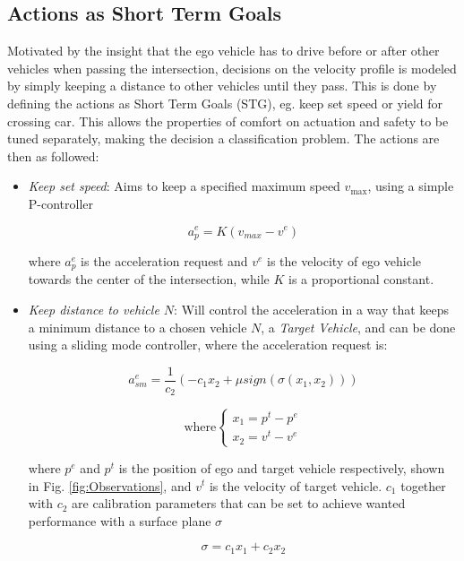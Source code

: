 \subsection{Actions as Short Term Goals}
\label{sec:actions}
Motivated by the insight that the ego vehicle has to drive before or after other vehicles when passing the intersection, decisions on the velocity profile is modeled by simply keeping a distance to other vehicles until they pass. This is done by defining the actions as Short Term Goals (STG), eg. keep set speed or yield for crossing car. 
This allows the properties of comfort on actuation and safety to be tuned separately, making the decision a classification problem. 
The actions are then as followed:
\begin{itemize}
	\item \textit{Keep set speed}: Aims to keep a specified maximum speed $v_{\max}$, using a simple P-controller
	
	\begin{equation}
	a^e_p = K (v_{max} - v^e)
	\label{eq:p_control}
	\end{equation}
	
	where $a^e_p$ is the acceleration request and $v^e$ is the velocity of ego vehicle towards the center of the intersection, while $K$ is a proportional constant. 
	
	\item \textit{Keep distance to vehicle $N$}: Will control the acceleration in a way that keeps a minimum distance to a chosen vehicle $N$, a {\em Target Vehicle}, and can be done using a sliding mode controller, where the acceleration request is:
	
    \begin{equation}
    	a^e_{sm} = \frac{1}{c_2} (- c_1 x_2 + \mu sign(\sigma(x_1, x_2))) 
    	\label{eq:sliding_mode}
    \end{equation}
    
    $$
    \text{where}
    \begin{cases}
    x_1 = p^t - p^e \\
    x_2 = v^t - v^e
    \end{cases}
    $$

    where $p^e$ and $p^t$ is the position of ego and target vehicle respectively, shown in Fig. \ref{fig:Observations}, and $v^t$ is the velocity of target vehicle. $c_1$ together with $c_2$ are calibration parameters that can be set to achieve wanted performance with a surface plane $\sigma$
    
    \begin{equation}
    	\sigma = c_1 x_1 + c_2 x_2
    \end{equation}
    

\end{itemize}
